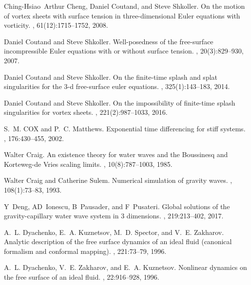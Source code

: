 \documentclass[11pt]{article}
\theoremstyle{plain}
\theoremstyle{definition}
\theoremstyle{definition}
\begin{document}
\begin{thebibliography}{10}
Ching-Hsiao~Arthur Cheng, Daniel Coutand, and Steve Shkoller.
\newblock On the motion of vortex sheets with surface tension in
  three-dimensional {E}uler equations with vorticity.
, 61(12):1715--1752, 2008.

Daniel Coutand and Steve Shkoller.
\newblock Well-posedness of the free-surface incompressible {E}uler equations
  with or without surface tension.
, 20(3):829--930, 2007.

Daniel Coutand and Steve Shkoller.
\newblock On the finite-time splash and splat singularities for the 3-d
  free-surface euler equations.
, 325(1):143--183, 2014.

Daniel Coutand and Steve Shkoller.
\newblock On the impossibility of finite-time splash singularities for vortex
  sheets.
, 221(2):987--1033, 2016.

S.~M. COX and P.~C. Matthews.
\newblock Exponential time differencing for stiff systems.
, 176:430--455, 2002.

Walter Craig.
\newblock An existence theory for water waves and the {B}oussinesq and
  {K}orteweg-de {V}ries scaling limits.
, 10(8):787--1003, 1985.

Walter Craig and Catherine Sulem.
\newblock Numerical simulation of gravity waves.
, 108(1):73--83, 1993.

Y~Deng, AD~Ionescu, B~Pausader, and F~Pusateri.
\newblock Global solutions of the gravity-capillary water wave system in 3
  dimensions.
, 219:213--402, 2017.

A.~L. Dyachenko, E.~A. Kuznetsov, M.~D. Spector, and V.~E. Zakharov.
\newblock Analytic description of the free surface dynamics of an ideal fluid
  (canonical formalism and conformal mapping).
, 221:73--79, 1996.

A.~L. Dyachenko, V.~E. Zakharov, and E.~A. Kuznetsov.
\newblock Nonlinear dynamics on the free surface of an ideal fluid.
, 22:916--928, 1996.


\end{thebibliography}
\end{document}

